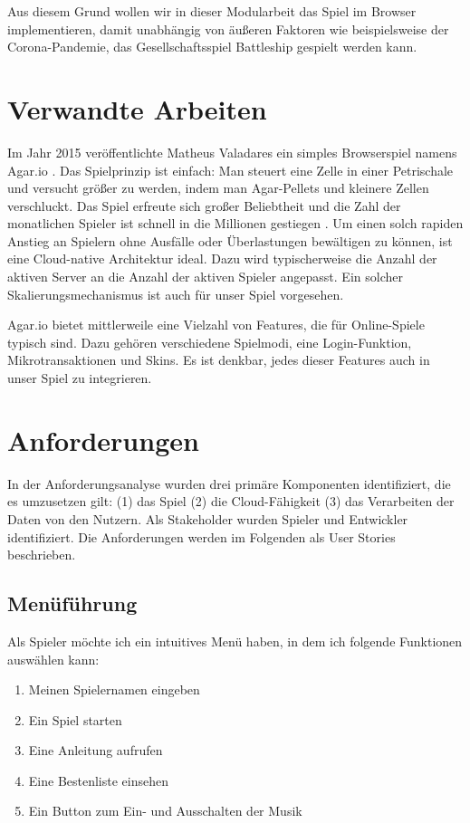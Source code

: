 \documentclass[a4paper, 10pt, conference]{IEEEtran}
\begin{document}
Aus diesem Grund wollen wir in dieser Modularbeit das Spiel im Browser implementieren, damit unabhängig von äußeren Faktoren wie beispielsweise der Corona-Pandemie, das Gesellschaftsspiel Battleship gespielt werden kann. 

\section{Verwandte Arbeiten}\label{sec:verwandte_arbeiten}

Im Jahr 2015 veröffentlichte Matheus Valadares ein simples Browserspiel namens Agar.io \cite{agario}. Das Spielprinzip ist einfach: Man steuert eine Zelle in einer Petrischale und versucht größer zu werden, indem man Agar-Pellets und kleinere Zellen verschluckt. Das Spiel erfreute sich großer Beliebtheit und die Zahl der monatlichen Spieler ist schnell in die Millionen gestiegen \cite{takahashi2017}. Um einen solch rapiden Anstieg an Spielern ohne Ausfälle oder Überlastungen bewältigen zu können, ist eine Cloud-native Architektur ideal. Dazu wird typischerweise die Anzahl der aktiven Server an die Anzahl der aktiven Spieler angepasst. Ein solcher Skalierungsmechanismus ist auch für unser Spiel vorgesehen.

Agar.io bietet mittlerweile eine Vielzahl von Features, die für Online-Spiele typisch sind. Dazu gehören verschiedene Spielmodi, eine Login-Funktion, Mikrotransaktionen und Skins. Es ist denkbar, jedes dieser Features auch in unser Spiel zu integrieren.

\section{Anforderungen}\label{sec:anforderungen}
In der Anforderungsanalyse wurden drei primäre Komponenten identifiziert, die es umzusetzen gilt: (1) das Spiel (2) die Cloud-Fähigkeit (3) das Verarbeiten der Daten von den Nutzern. Als Stakeholder wurden Spieler und Entwickler identifiziert. Die Anforderungen werden im Folgenden als User Stories beschrieben.


\subsection{Menüführung}
Als Spieler möchte ich ein intuitives Menü haben, in dem ich folgende Funktionen auswählen kann:
\begin{enumerate}
	\item Meinen Spielernamen eingeben
	\item Ein Spiel starten
	\item Eine Anleitung aufrufen
	\item Eine Bestenliste einsehen
	\item Ein Button zum Ein- und Ausschalten der Musik
\end{enumerate}
\end{document}
